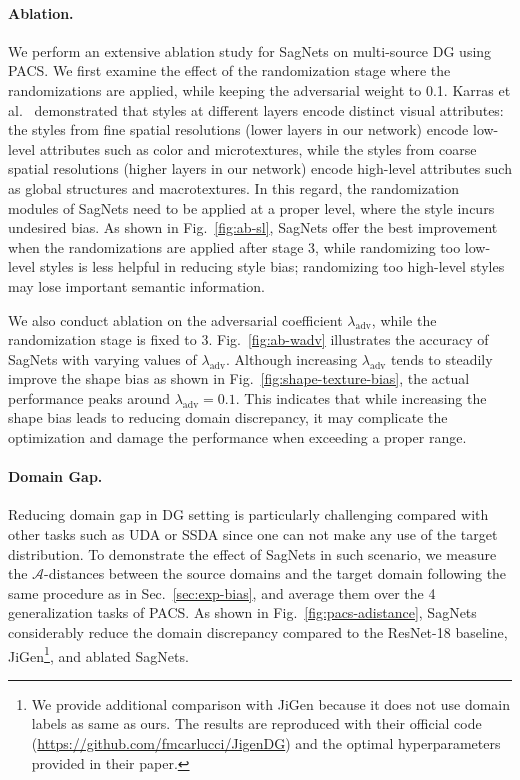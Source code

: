 \paragraph{\textnormal{\textbf{Ablation.}}}
We perform an extensive ablation study for SagNets on multi-source DG using PACS.
We first examine the effect of the randomization stage where the randomizations are applied, while keeping the adversarial weight to 0.1.
Karras et al.~\cite{karras2019style} demonstrated that styles at different layers encode distinct visual attributes: the styles from fine spatial resolutions (lower layers in our network) encode low-level attributes such as color and microtextures, while the styles from coarse spatial resolutions (higher layers in our network) encode high-level attributes such as global structures and macrotextures.
In this regard, the randomization modules of SagNets need to be applied at a proper level, where the style incurs undesired bias.
As shown in Fig.~\ref{fig:ab-sl}, SagNets offer the best improvement when the randomizations are applied after stage 3, 
while randomizing too low-level styles is less helpful in reducing style bias; randomizing too high-level styles may lose important semantic information.


We also conduct ablation on the adversarial coefficient $\lambda_\text{adv}$, while the randomization stage is fixed to 3.
Fig.~\ref{fig:ab-wadv} illustrates the accuracy of SagNets with varying values of $\lambda_\text{adv}$. 
Although increasing $\lambda_\text{adv}$ tends to steadily improve the shape bias as shown in Fig.~\ref{fig:shape-texture-bias}, the actual performance peaks around $\lambda_\text{adv} = 0.1$.
This indicates that while increasing the shape bias leads to reducing domain discrepancy, it may complicate the optimization and damage the performance when exceeding a proper range.



\paragraph{\textnormal{\textbf{Domain Gap.}}}
Reducing domain gap in DG setting is particularly challenging compared with other tasks such as UDA or SSDA since one can not make any use of the target distribution.
To demonstrate the effect of SagNets in such scenario, we measure the $\mathcal{A}$-distances between the source domains and the target domain following the same procedure as in Sec.~\ref{sec:exp-bias}, and average them over the 4 generalization tasks of PACS.
As shown in Fig.~\ref{fig:pacs-adistance}, SagNets considerably reduce the domain discrepancy compared to the ResNet-18 baseline, JiGen\footnote{\label{fn:jigen}We provide additional comparison with JiGen because it does not use domain labels as same as ours.
The results are reproduced with their official code (\url{https://github.com/fmcarlucci/JigenDG}) and the optimal hyperparameters provided in their paper.
}, and ablated SagNets.



